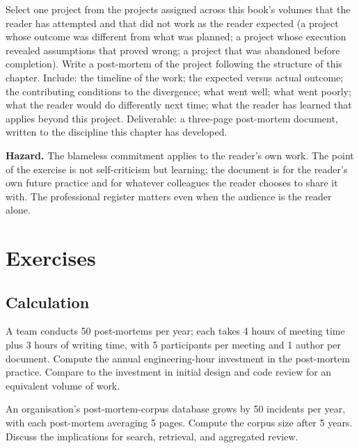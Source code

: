 \begin{project}
Select one project from the projects assigned across this book's volumes that the reader has attempted and that did not work as the reader expected (a project whose outcome was different from what was planned; a project whose execution revealed assumptions that proved wrong; a project that was abandoned before completion). Write a post-mortem of the project following the structure of this chapter. Include: the timeline of the work; the expected versus actual outcome; the contributing conditions to the divergence; what went well; what went poorly; what the reader would do differently next time; what the reader has learned that applies beyond this project. Deliverable: a three-page post-mortem document, written to the discipline this chapter has developed.

\textbf{Hazard.} The blameless commitment applies to the reader's own work. The point of the exercise is not self-criticism but learning; the document is for the reader's own future practice and for whatever colleagues the reader chooses to share it with. The professional register matters even when the audience is the reader alone.
\end{project}

\section{Exercises}

\subsection*{Calculation}

\begin{exercise}
A team conducts 50 post-mortems per year; each takes 4 hours of meeting time plus 3 hours of writing time, with 5 participants per meeting and 1 author per document. Compute the annual engineering-hour investment in the post-mortem practice. Compare to the investment in initial design and code review for an equivalent volume of work.
\end{exercise}

\begin{exercise}
An organisation's post-mortem-corpus database grows by 50 incidents per year, with each post-mortem averaging 5 pages. Compute the corpus size after 5 years. Discuss the implications for search, retrieval, and aggregated review.
\end{exercise}

